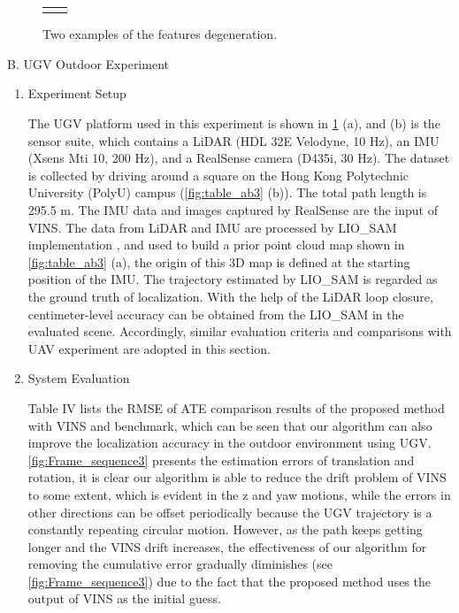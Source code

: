 \documentclass[10pt, letterpaper]{article}
\begin{document}
\begin{multicols*}{2}
\begin{figure}[H]
\begin{tabular}{cc}{}
    \end{tabular}
    \caption{Two examples of the features degeneration.}
    \label{fig:table_ab2}
\end{figure}

B. UGV Outdoor Experiment
\begin{enumerate}%
                \item  Experiment Setup

                
The UGV platform used in this experiment is shown in \cref{fig:table_ab2} (a), and (b) is the sensor suite, which contains a LiDAR
(HDL 32E Velodyne, 10 Hz), an IMU (Xsens Mti 10, 200 Hz),
and a RealSense camera (D435i, 30 Hz). The dataset is
collected by driving around a square on the Hong Kong
Polytechnic University (PolyU) campus (\cref{fig:table_ab3} (b)). The total
path length is 295.5 m. The IMU data and images captured by
RealSense are the input of VINS. The data from LiDAR and
IMU are processed by LIO\_SAM implementation \cite{shan2020lio}, and
used to build a prior point cloud map shown in \cref{fig:table_ab3} (a), the
origin of this 3D map is defined at the starting position of the
IMU. The trajectory estimated by LIO\_SAM is regarded as the
ground truth of localization. With the help of the LiDAR loop
closure, centimeter-level accuracy can be obtained from the
LIO\_SAM in the evaluated scene. Accordingly, similar
evaluation criteria and comparisons with UAV experiment are
adopted in this section.
                \item System Evaluation


                Table IV lists the RMSE of ATE comparison results of the
proposed method with VINS and benchmark, which can be seen
that our algorithm can also improve the localization accuracy in
the outdoor environment using UGV. \cref{fig:Frame_sequence3} presents the
estimation errors of translation and rotation, it is clear our
algorithm is able to reduce the drift problem of VINS to some
extent, which is evident in the z and yaw motions, while the
errors in other directions can be offset periodically because the
UGV trajectory is a constantly repeating circular motion.
However, as the path keeps getting longer and the VINS drift
increases, the effectiveness of our algorithm for removing the
cumulative error gradually diminishes (see \cref{fig:Frame_sequence3}) due to the
fact that the proposed method uses the output of VINS as the
initial guess.


\end{enumerate}
\end{multicols*}
\end{document}
